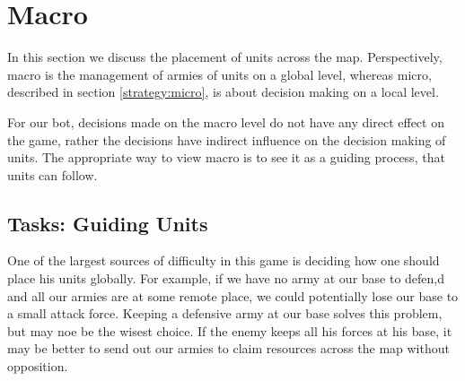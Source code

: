 %
%
%
%
%

\section{Macro}
\label{strategy:macro}
In this section we discuss the placement of units across the map. Perspectively, macro is the management of armies of units on a global level, whereas micro, described in section \ref{strategy:micro}, is about decision making on a local level. 

For our bot, decisions made on the macro level do not have any direct effect on the game, rather the decisions have indirect influence on the decision making of units. The appropriate way to view macro is to see it as a guiding process, that units can follow.

\subsection{Tasks: Guiding Units}
One of the largest sources of difficulty in this game is deciding how one should place his units globally. For example, if we have no army at our base to defen,d and all our armies are at some remote place, we could potentially lose our base to a small attack force. Keeping a defensive army at our base solves this problem, but may noe be the wisest choice. If the enemy keeps all his forces at his base, it may be better to send out our armies to claim resources across the map without opposition.

